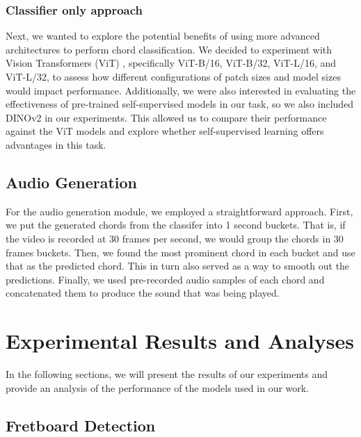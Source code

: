 \documentclass[10pt,twocolumn,letterpaper]{article}
\begin{document}

\subsubsection{Classifier only approach}
Next, we wanted to explore the potential benefits of using more advanced architectures to perform chord classification. We decided to experiment with Vision Transformers (ViT) \cite{dosovitskiy2020image}, specifically ViT-B/16, ViT-B/32, ViT-L/16, and ViT-L/32, to assess how different configurations of patch sizes and model sizes would impact performance. Additionally, we were also interested in evaluating the effectiveness of pre-trained self-supervised models in our task, so we also included DINOv2 \cite{oquab2023dinov2} in our experiments. This allowed us to compare their performance against the ViT models and explore whether self-supervised learning offers advantages in this task.

\subsection{Audio Generation}
For the audio generation module, we employed a straightforward approach. First, we put the generated chords from the classifer into 1 second buckets. That is, if the video is recorded at 30 frames per second, we would group the chords in 30 frames buckets. Then, we found the most prominent chord in each bucket and use that as the predicted chord. This in turn also served as a way to smooth out the predictions. Finally, we used pre-recorded audio samples of each chord and concatenated them to produce the sound that was being played.

\section{Experimental Results and Analyses}
\label{sec:results}

In the following sections, we will present the results of our experiments and provide an analysis of the performance of the models used in our work.

\subsection{Fretboard Detection}
\end{document}
